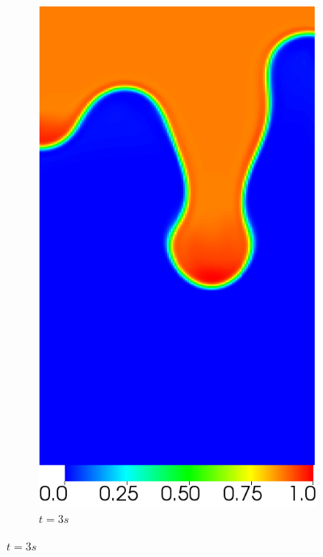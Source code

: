 \begin{figure}[H]
\begin{subfigure}[ht!]{0.2\textwidth}
		\includegraphics[width=1\textwidth]{figure/PT_RT/concent1/visit0003.png}
		\caption{$t=3s$}
	\end{subfigure}
\end{figure}\vspace{-0.8cm}
